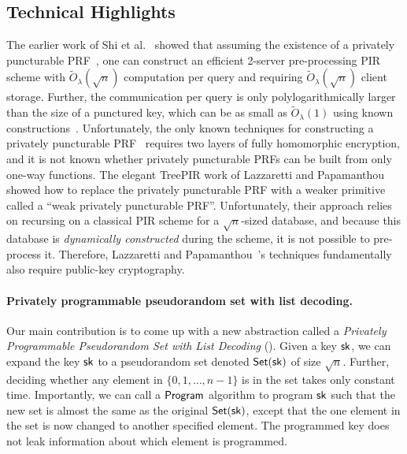 
 
\subsection{Technical Highlights}
The earlier work of Shi et al.~\cite{shi-pir}
showed that assuming the existence of 
a privately puncturable 
PRF~\cite{privpuncprf00,privpuncprf01,privpuncprf02,privpuncprf03}, 
one can 
construct an efficient 2-server pre-processing PIR scheme
with 
$\widetilde{O}_\lambda(\sqrt{n})$
computation per query and  
requiring 
$\widetilde{O}_\lambda(\sqrt{n})$
client storage. 
Further, the communication per query
is only polylogarithmically larger than
 the size of a punctured key, which can be as small as
$\widetilde{O}_\lambda(1)$ using 
known constructions~\cite{privpuncprf00,privpuncprf01,privpuncprf02,privpuncprf03}. 
Unfortunately, the only known 
techniques 
for constructing a privately puncturable 
PRF~\cite{privpuncprf00,privpuncprf01,privpuncprf02,privpuncprf03}
requires two 
layers of fully homomorphic encryption, and it is not known
whether privately puncturable
PRFs can be built from only one-way functions.  
The elegant TreePIR work of 
Lazzaretti
and Papamanthou~\cite{treepir}
showed how to replace the privately puncturable
PRF with a weaker primitive called a ``weak 
privately puncturable PRF''.
Unfortunately, their approach relies on recursing
on a classical PIR scheme for a $\sqrt{n}$-sized
database, and because this database is {\it dynamically constructed} 
during the scheme, it is not possible 
to pre-process it.
Therefore, Lazzaretti
and Papamanthou~\cite{treepir}'s techniques
fundamentally also require 
public-key cryptography.

\paragraph{Privately programmable pseudorandom set with list decoding.}
Our main contribution is to come up with a new abstraction
called a {\it Privately Programmable 
Pseudorandom Set with List Decoding} (\ppps). 
Given a \ppps key $\mathsf{sk}$, we can 
expand the key $\mathsf{sk}$ to a pseudorandom set 
denoted ${\sf Set}(\mathsf{sk})$ of size $\sqrt{n}$.
Further, deciding whether any element in $\{0, 1, \ldots, n-1\}$ is in the 
set takes only constant time. 
Importantly, we can call a ${\sf Program}$ 
algorithm to program $\mathsf{sk}$ such that the new  
set  is almost the same as the original ${\sf Set}(\mathsf{sk})$, except
that the   
one element in the set 
is now changed to another specified element.
The programmed key 
does not leak information about 
which element is programmed.

